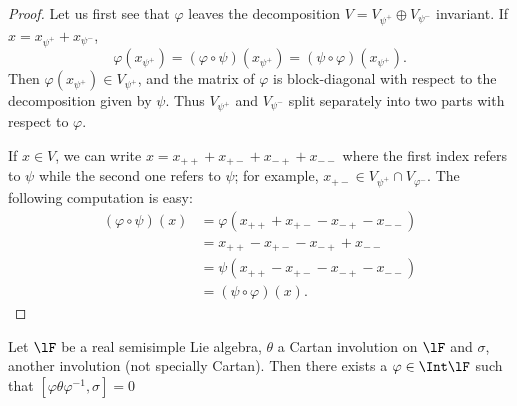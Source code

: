 \begin{proof}
Let us first see that $\varphi$ leaves the decomposition $V=V_{\psi^+}\oplus V_{\psi^-}$ invariant. If $x=x_{\psi^+}+x_{\psi^-}$,
\[
   \varphi(x_{\psi^+})=(\varphi\circ\psi)(x_{\psi^+})=(\psi\circ\varphi)(x_{\psi^+}).
\]
Then $\varphi(x_{\psi^+})\in V_{\psi^+}$, and the matrix of $\varphi$ is block-diagonal with respect to the decomposition given by $\psi$. Thus $V_{\psi^+}$ and $V_{\psi^-}$ split separately into two parts with respect to $\varphi$.

If $x\in V$, we can write $x=x_{++}+x_{+-}+x_{-+}+x_{--}$ where the first index refers to $\psi$ while the second one refers to $\psi$; for example, $x_{+-}\in V_{\psi^+}\cap V_{\varphi^-}$. The following computation is easy:
\begin{equation}
\begin{split}
(\varphi\circ\psi)(x)&=\varphi(x_{++}+x_{+-}-x_{-+}-x_{--})\\
                 &=x_{++}-x_{+-}-x_{-+}+x_{--}\\
         &=\psi(x_{++}-x_{+-}-x_{-+}-x_{--})\\
         &=(\psi\circ\varphi)(x).
\end{split}
\end{equation}
\end{proof}

\begin{theorem}
Let $\lF$ be a real semisimple Lie algebra, $\theta$ a Cartan involution on $\lF$ and $\sigma$, another involution (not specially Cartan). Then there exists a $\varphi\in\Int\lF$ such that $[\varphi\theta\varphi^{-1},\sigma]=0$
\label{tho:sigma_theta_un}
\end{theorem}

